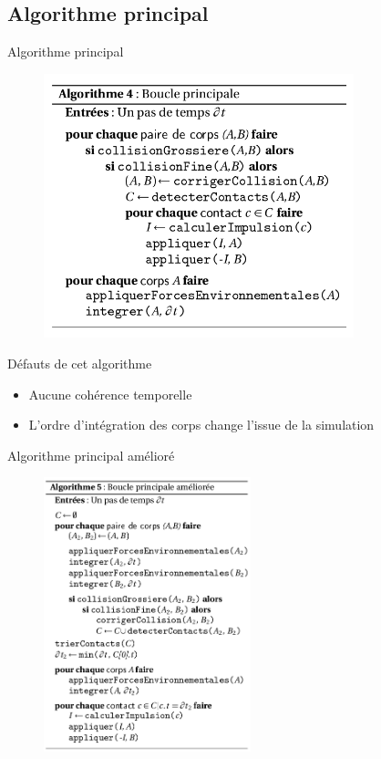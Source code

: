 \documentclass{beamer}
\begin{document}
\subsection{Algorithme principal}

\begin{frame}{Algorithme principal}
  \begin{figure}
    \includegraphics[width=9cm]{images/algo1.png}
  \end{figure}
\end{frame}

\begin{frame}{Défauts de cet algorithme}
  \begin{itemize}
    \item Aucune cohérence temporelle

      \vfill

    \item L'ordre d'intégration des corps change l'issue de la simulation \\

      \vfill

      \begin{figure}
        
      \end{figure}
  \end{itemize}
\end{frame}

\begin{frame}{Algorithme principal amélioré}
  \begin{figure}
    \includegraphics[width=6cm]{images/algo2.png}
  \end{figure}
\end{frame}
\end{document}
